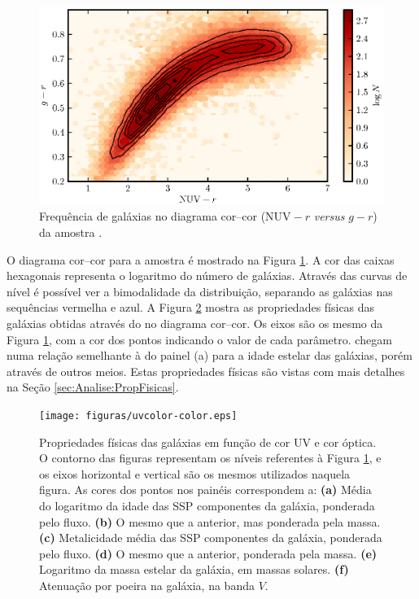 \begin{figure}
	\includegraphics{figuras/uvcolor-color-density.eps}
	\caption[Frequência de galáxias no diagrama cor--cor.]
	{Frequência de galáxias no diagrama cor--cor ($\mathrm{NUV}-r$ {\em versus}
	$g-r$) da amostra \starlightUV.}
	\label{fig:DensityColor}
\end{figure}

O diagrama cor--cor para a amostra \starlightUV é mostrado na Figura
\ref{fig:DensityColor}. A cor das caixas hexagonais representa o logaritmo do
número de galáxias. Através das curvas de nível é possível ver a bimodalidade da
distribuição, separando as galáxias nas sequências vermelha e azul. A Figura
\ref{fig:ColorStarlightParam} mostra as propriedades físicas das galáxias
obtidas através do \starlight no diagrama cor--cor. Os eixos são os mesmo da
Figura \ref{fig:DensityColor}, com a cor dos pontos indicando o valor de cada
parâmetro. \citeauthor{Chilingarian2011} chegam numa relação semelhante à do
painel (a) para a idade estelar das galáxias, porém através de outros meios.
Estas propriedades físicas são vistas com mais detalhes na Seção
\ref{sec:Analise:PropFisicas}.

\begin{figure}
	\texttt{[image: figuras/uvcolor-color.eps]}
	\caption[Diagrama cor--cor para os diversos parâmetros \starlight.]
	{Propriedades físicas das galáxias em função de cor UV e cor óptica. O contorno
	das figuras representam os níveis referentes à Figura \ref{fig:DensityColor},
	e os eixos horizontal e vertical são os mesmos utilizados naquela figura. As
	cores dos pontos nos painéis correspondem a: \textbf{(a)} Média do logaritmo
	da idade das SSP componentes da galáxia, ponderada pelo fluxo. \textbf{(b)} O
	mesmo que a anterior, mas ponderada pela massa. \textbf{(c)} Metalicidade média
	das SSP componentes da galáxia, ponderada pelo fluxo. \textbf{(d)} O mesmo que
	a anterior, ponderada pela massa. \textbf{(e)} Logaritmo da massa estelar da
	galáxia, em massas solares. \textbf{(f)} Atenuação por poeira na galáxia, na
	banda $V$.}
	\label{fig:ColorStarlightParam}
\end{figure}


